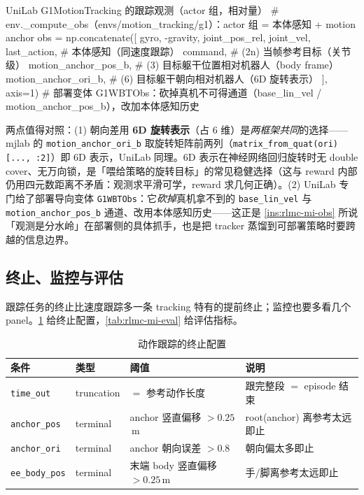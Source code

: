 \begin{codebox}[Python]{UniLab G1MotionTracking 的跟踪观测（actor 组，相对量）}
# env._compute_obs（envs/motion_tracking/g1）：actor 组 = 本体感知 + motion anchor
obs = np.concatenate([
    gyro, -gravity, joint_pos_rel, joint_vel, last_action,  # 本体感知（同速度跟踪）
    command,                 # (2n) 当帧参考目标（关节级）
    motion_anchor_pos_b,     # (3)  目标躯干位置相对机器人（body frame）
    motion_anchor_ori_b,     # (6)  目标躯干朝向相对机器人（6D 旋转表示）
], axis=1)
# 部署变体 G1WBTObs：砍掉真机不可得通道（base_lin_vel / motion_anchor_pos_b），改加本体感知历史
\end{codebox}

两点值得对照：(1) 朝向差用 \textbf{6D 旋转表示}（占 6 维）是\emph{两框架共同}的选择——mjlab 的 \verb|motion_anchor_ori_b| 取旋转矩阵前两列（\verb|matrix_from_quat(ori)[..., :2]|）即 6D 表示，UniLab 同理。6D 表示在神经网络回归旋转时无 double cover、无万向锁，是「喂给策略的旋转目标」的常见稳健选择（这与 reward 内部仍用四元数距离不矛盾：观测求平滑可学，reward 求几何正确）。(2) UniLab 专门给了部署导向变体 \verb|G1WBTObs|：它\emph{砍掉}真机拿不到的 \verb|base_lin_vel| 与 \verb|motion_anchor_pos_b| 通道、改用本体感知历史——这正是 \cref{ins:rlmc-mi-obs} 所说「观测是分水岭」在部署侧的具体抓手，也是把 tracker 蒸馏到可部署策略时要跨越的信息边界。

\subsection{终止、监控与评估}
\label{sec:rlmc-mi-mjlab-term}

跟踪任务的终止比速度跟踪多一条 tracking 特有的提前终止；监控也要多看几个 panel。\cref{tab:rlmc-mi-term} 给终止配置，\cref{tab:rlmc-mi-eval} 给评估指标。

\begin{table}[ht]
\centering
\small
\caption{动作跟踪的终止配置}
\label{tab:rlmc-mi-term}
\begin{tabular}{@{}llll@{}}
\toprule
条件 & 类型 & 阈值 & 说明 \\
\midrule
\verb|time_out| & truncation & $=$ 参考动作长度 & 跟完整段 $=$ episode 结束 \\
\verb|anchor_pos| & terminal & anchor 竖直偏移 $> 0.25$\,m & root(anchor) 离参考太远即止 \\
\verb|anchor_ori| & terminal & anchor 朝向误差 $> 0.8$ & 朝向偏太多即止 \\
\verb|ee_body_pos| & terminal & 末端 body 竖直偏移 $> 0.25$\,m & 手/脚离参考太远即止 \\
\bottomrule
\end{tabular}
\end{table}

